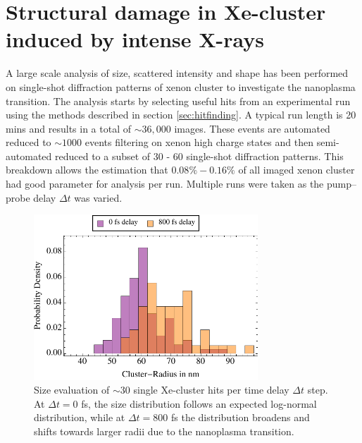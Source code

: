 \section{Structural damage in Xe-cluster induced by intense X-rays}\label{sec:xenon-data}
A large scale analysis of size, scattered intensity and shape has been performed on single-shot diffraction patterns of xenon cluster to investigate the nanoplasma transition. The analysis starts by selecting useful hits from an experimental run using the methods described in section \ref{sec:hitfinding}. A typical run length is 20 mins and results in a total of $\sim 36,000$ images. These events are automated reduced to $\sim 1000$ events filtering on xenon high charge states and then semi-automated reduced to a subset of 30 - 60 single-shot diffraction patterns. This breakdown allows the estimation that $0.08\% - 0.16\%$ of all imaged xenon cluster had good parameter for analysis per run. Multiple runs were taken as the pump--probe delay $\Delta t$ was varied.\\
\begin{figure}
	\centering
		\includegraphics[width=0.75\textwidth]{images/size-distributions.pdf}
	\caption[Single Xe-cluster size distribution at varying time delay $\Delta t$.]{Size evaluation of $\sim 30$ single Xe-cluster hits per time delay $\Delta t$ step. At $\Delta t=0$ fs, the size distribution follows an expected log-normal distribution, while at $\Delta t=800$ fs the distribution broadens and shifts towards larger radii due to the nanoplasma transition.}
	\label{fig:size-distributions}
\end{figure}
